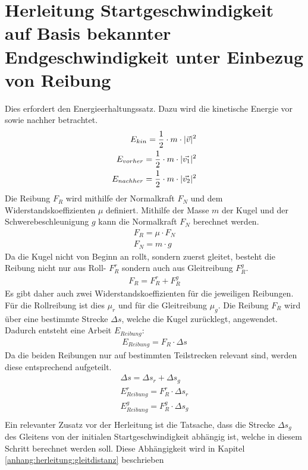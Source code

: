 \section{Herleitung Startgeschwindigkeit auf Basis bekannter Endgeschwindigkeit unter Einbezug von Reibung}\label{anhang:herleitung:StartgeschwAnhandEndgeschwMitReibung}
Dies erfordert den Energieerhaltungssatz. Dazu wird die kinetische Energie vor sowie nachher betrachtet.
\begin{align}
    E_{kin} = \frac{1}{2} \cdot m \cdot \lvert \vec{v} \rvert^2\\
    E_{vorher} = \frac{1}{2} \cdot m \cdot \lvert \vec{v_1} \rvert^2\\
    E_{nachher} = \frac{1}{2} \cdot m \cdot \lvert \vec{v_2} \rvert^2
\end{align}
Die Reibung $F_R$ wird mithilfe der Normalkraft $F_N$ und dem Widerstandskoeffizienten $\mu$ definiert\cite{wiki.rollreibung:1}.
Mithilfe der Masse $m$ der Kugel und der Schwerebeschleunigung $g$ kann die Normalkraft $F_N$ berechnet werden.
\begin{align}
    F_R = \mu \cdot F_N\\
    F_N = m \cdot g
\end{align}
Da die Kugel nicht von Beginn an rollt, sondern zuerst gleitet, besteht die Reibung nicht nur aus Roll- $F^r_R$ sondern auch aus
Gleitreibung $F^g_R$.
\begin{align}
    F_R = F^r_R + F^g_R
\end{align}
Es gibt daher auch zwei Widerstandskoeffizienten für die jeweiligen Reibungen. Für die Rollreibung ist dies $\mu_r$ und
für die Gleitreibung $\mu_g$.
Die Reibung $F_R$ wird über eine bestimmte Strecke $\Delta s$, welche die Kugel zurücklegt, angewendet.
Dadurch entsteht eine Arbeit $E_{Reibung}$\cite{wiki.arbeit_physik:1}:
\begin{align}
    E_{Reibung} = F_R \cdot \Delta s
\end{align}
Da die beiden Reibungen nur auf bestimmten Teilstrecken relevant sind, werden diese entsprechend aufgeteilt.
\begin{align}
    \Delta s = \Delta s_r + \Delta s_g\\
    E^r_{Reibung} = F^r_R \cdot \Delta s_r\\
    E^g_{Reibung} = F^g_R \cdot \Delta s_g\\
\end{align}
Ein relevanter Zusatz vor der Herleitung ist die Tatsache, dass die Strecke $\Delta s_g$ des Gleitens von der initialen
Startgeschwindigkeit abhängig ist, welche in diesem Schritt berechnet werden soll. Diese Abhängigkeit wird in Kapitel \ref{anhang:herleitung:gleitdistanz} beschrieben
